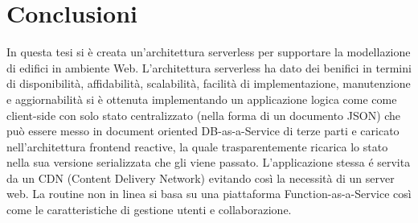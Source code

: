 \section{Conclusioni}
\label{sec:conclusions_section_1}

In questa tesi si \`e creata un'architettura serverless per supportare la modellazione di edifici in ambiente Web.
L'architettura serverless ha dato dei benifici in termini di disponibilit\`a, affidabilit\`a,  scalabilit\`a,
facilità di implementazione, manutenzione e aggiornabilità si \`e ottenuta implementando un applicazione logica come
come client-side con solo stato centralizzato (nella forma di un documento JSON) che pu\`o essere messo in
 document oriented DB-as-a-Service di terze parti e caricato nell'architettura frontend reactive, la quale
 trasparentemente ricarica lo stato nella sua versione serializzata che gli viene passato.
 L'applicazione stessa \'e servita da un CDN (Content Delivery Network) evitando cos\`i la necessit\`a di un server web.
 La routine non in linea si basa su una piattaforma Function-as-a-Service cos\`i come le caratteristiche
 di gestione utenti e collaborazione.


